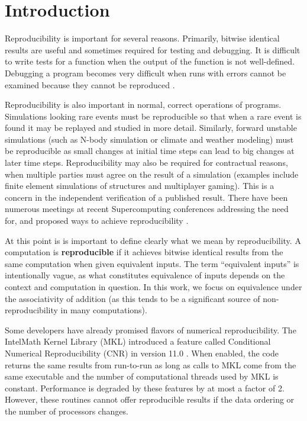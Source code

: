 \section{Introduction}
  Reproducibility is important for several reasons. Primarily, bitwise identical results are useful and sometimes required for testing and debugging. It is difficult to write tests for a function when the output of the function is not well-defined. Debugging a program becomes very difficult when runs with errors cannot be examined because they cannot be reproduced \cite{reproducibilityBOF}.

  Reproducibility is also important in normal, correct operations of programs. Simulations looking rare events must be reproducible so that when a rare event is found it may be replayed and studied in more detail. Similarly, forward unstable simulations (such as N-body simulation or climate and weather modeling) must be reproducible as small changes at initial time steps can lead to big changes at later time steps. Reproducibility may also be required for contractual reasons, when multiple parties must agree on the result of a simulation (examples include finite element simulations of structures and multiplayer gaming). This is a concern in the independent verification of a published result. There have been numerous meetings at recent Supercomputing conferences addressing the need for, and proposed ways to achieve reproducibility \cite{reproducibilityBOF}.

  At this point is is important to define clearly what we mean by reproducibility. A computation is \textbf{reproducible} if it achieves bitwise identical results from the same computation when given equivalent inputs. The term ``equivalent inputs'' is intentionally vague, as what constitutes equivalence of inputs depends on the context and computation in question. In this work, we focus on equivalence under the associativity of addition (as this tends to be a significant source of non-reproducibility in many computations). 

  Some developers have already promised flavors of numerical reproducibility. The Intel\textregistered Math Kernel Library (MKL) introduced a feature called Conditional Numerical Reproducibility (CNR) in version 11.0 \cite{MKL}. When enabled, the code returns the same results from run-to-run as long as calls to MKL come from the same executable and the number of computational threads used by MKL is constant. Performance is degraded by these features by at most a factor of 2. However, these routines cannot offer reproducible results if the data ordering or the number of processors changes.

